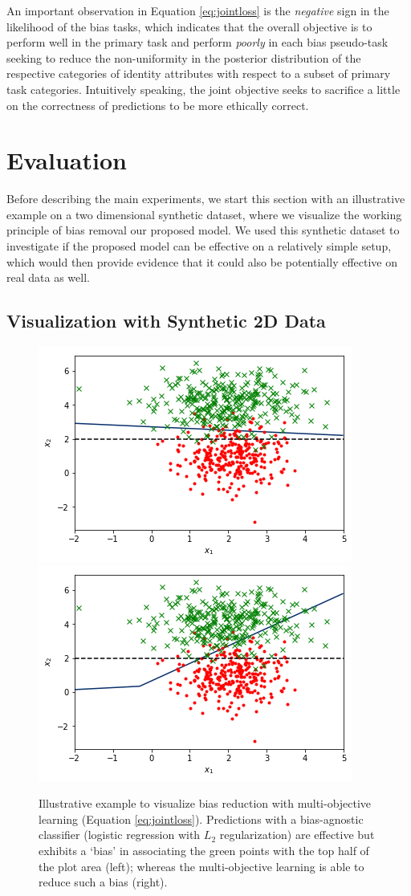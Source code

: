 \documentclass[letterpaper]{article}
\begin{document}
An important observation in Equation \ref{eq:jointloss} is the \emph{negative} sign in the likelihood of the bias tasks, which indicates that the overall objective is to perform well in the primary task and perform \emph{poorly} in each bias pseudo-task seeking to reduce the non-uniformity in the posterior distribution of the respective categories of identity attributes with respect to a subset of primary task categories.
Intuitively speaking, the joint objective seeks to sacrifice a little on the correctness of predictions to be more ethically correct.


\section{Evaluation}

Before describing the main experiments, we start this section with an illustrative example on a two dimensional synthetic dataset, where we visualize the working principle of bias removal our proposed model. We used this synthetic dataset to investigate if the proposed model can be effective on a relatively simple setup, which would then provide evidence that it could also be potentially effective on real data as well.

\subsection{Visualization with Synthetic 2D Data}

\begin{figure}[t]
\centering
\includegraphics[width=0.49\columnwidth]{biased_boundary.png}
\includegraphics[width=0.49\columnwidth]{debiased_boundary.png}
\caption{Illustrative example to visualize bias reduction with multi-objective learning (Equation \ref{eq:jointloss}). Predictions
with a bias-agnostic classifier (logistic regression with $L_2$ regularization) are effective but exhibits a `bias' in associating the green points with the top half of the plot area (left); whereas the multi-objective learning is able to reduce such a bias (right).
\label{fig:2d-data}}
\end{figure}
\end{document}
